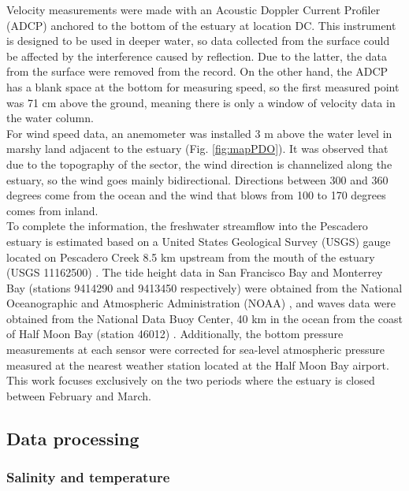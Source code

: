 \documentclass[tesis.tex]{subfiles}
\begin{document}
Velocity measurements were made with an Acoustic Doppler Current Profiler (ADCP) anchored to the bottom of the estuary at location DC. This instrument is designed to be used in deeper water, so data collected from the surface could be affected by the interference caused by reflection. Due to the latter, the data from the surface were removed from the record. On the other hand, the ADCP has a blank space at the bottom for measuring speed, so the first measured point was 71 cm above the ground, meaning there is only a window of velocity data in the water column. \\

For wind speed data, an anemometer was installed 3 m above the water level in marshy land adjacent to the estuary (Fig. \ref{fig:mapPDO}). It was observed that due to the topography of the sector, the wind direction is channelized along the estuary, so the wind goes mainly bidirectional. Directions between 300 and 360 degrees come from the ocean and the wind that blows from 100 to 170 degrees comes from inland.\\

To complete the information, the freshwater streamflow into the Pescadero estuary is estimated based on a United States Geological Survey (USGS) gauge located on Pescadero Creek 8.5 km upstream from the mouth of the estuary (USGS 11162500) \citep{usgs2022discharge}. The tide height data in San Francisco Bay and Monterrey Bay (stations 9414290 and 9413450 respectively) were obtained from the National Oceanographic and Atmospheric Administration (NOAA) \citep{noaa2022sftides, noaa2022mntytides}, and waves data were obtained from the National Data Buoy Center, 40 km in the ocean from the coast of Half Moon Bay (station 46012) \citep{noaa2022waves}. Additionally, the bottom pressure measurements at each sensor were corrected for sea-level atmospheric pressure measured at the nearest weather station located at the Half Moon Bay airport. This work focuses exclusively on the two periods where the estuary is closed between February and March.\\

\subsection{Data processing}

\subsubsection{Salinity and temperature}
\end{document}

